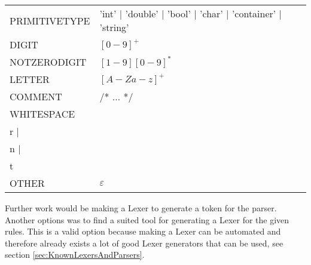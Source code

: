\begin{tabular}{l l}
PRIMITIVETYPE & 'int' | 'double' | 'bool' | 'char' | 'container' | 'string' \\
DIGIT & $[0 - 9]^+$ \\
NOTZERODIGIT & $[1-9][0-9]^*$ \\
LETTER & $[A-Za-z]^+$\\
COMMENT & /* $\dots$ */ \\
WHITESPACE & \\r | \\n | \\t \\
OTHER & $\varepsilon$ \\
\end{tabular}

Further work would be making a Lexer to generate a token for the parser. Another options was to find a suited tool for generating a Lexer for the given rules. This is a valid option because making a Lexer can be automated and therefore already exists a lot of good Lexer generators that can be used, see section \ref{sec:KnownLexersAndParsers}.